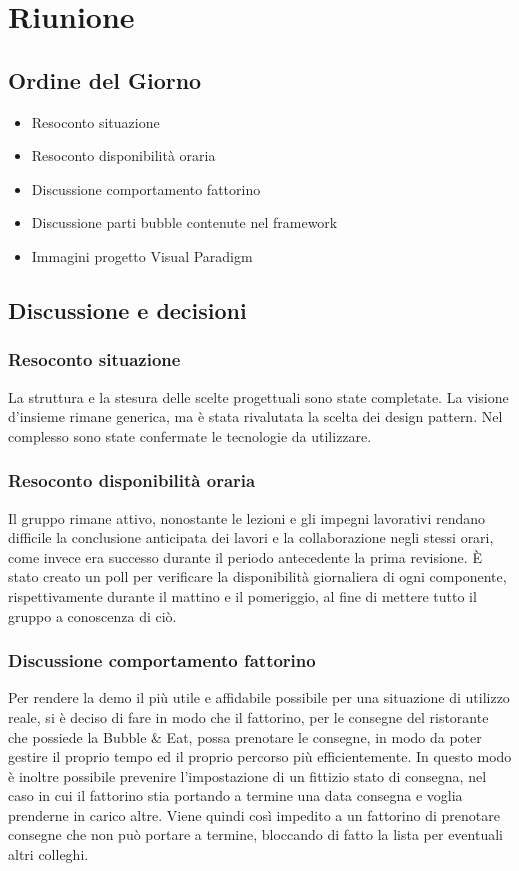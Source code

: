 \section{Riunione}
\subsection{Ordine del Giorno}
\begin{itemize}
	\item Resoconto situazione
	\item Resoconto disponibilità oraria
	\item Discussione comportamento fattorino
	\item Discussione parti bubble contenute nel framework 
	\item Immagini progetto Visual Paradigm
\end{itemize}

\subsection{Discussione e decisioni}

\subsubsection{Resoconto situazione}
La struttura e la stesura delle scelte progettuali sono state completate. La visione d'insieme rimane generica, ma è stata rivalutata la scelta dei design pattern. Nel complesso sono state confermate le tecnologie da utilizzare.

\subsubsection{Resoconto disponibilità oraria}
Il gruppo rimane attivo, nonostante le lezioni e gli impegni lavorativi rendano difficile la conclusione anticipata dei lavori e la collaborazione negli stessi orari, come invece era successo durante il periodo antecedente la prima revisione. È stato creato un poll per verificare la disponibilità giornaliera di ogni componente, rispettivamente durante il mattino e il pomeriggio, al fine di mettere tutto il gruppo a conoscenza di ciò.

\subsubsection{Discussione comportamento fattorino}
Per rendere la demo il più utile e affidabile possibile per una situazione di utilizzo reale, si è deciso di fare in modo che il fattorino, per le consegne del ristorante che possiede la Bubble \& Eat, possa prenotare le consegne, in modo da poter gestire il proprio tempo ed il proprio percorso più efficientemente. In questo modo è inoltre possibile prevenire l'impostazione di un fittizio stato di consegna, nel caso in cui il fattorino stia portando a termine una data consegna e voglia prenderne in carico altre. Viene quindi così impedito a un fattorino di prenotare consegne che non può portare a termine, bloccando di fatto la lista per eventuali altri colleghi.

